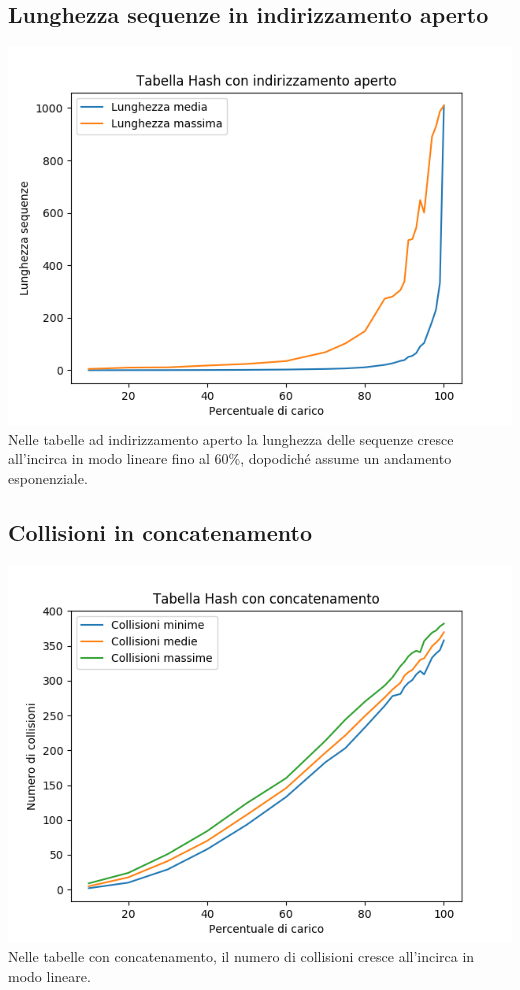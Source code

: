 \documentclass[]{article}
\begin{document}
\subsection*{Lunghezza sequenze in indirizzamento aperto}
\includegraphics {IA-sequenze.png}
Nelle tabelle ad indirizzamento aperto la lunghezza delle sequenze cresce all'incirca in modo lineare fino al 60\%, dopodiché assume un andamento esponenziale.

\subsection*{Collisioni in concatenamento}
\includegraphics {C-collisioni.png}
Nelle tabelle con concatenamento, il numero di collisioni cresce all'incirca in modo lineare.
\end{document}
